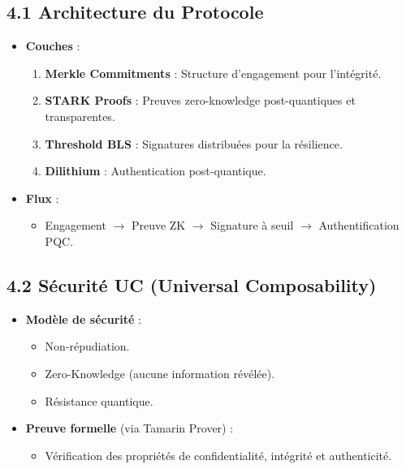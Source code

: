 \documentclass[12pt, a4paper]{report}
\begin{document}
\subsection*{4.1 Architecture du Protocole}
\begin{itemize}
    \item \textbf{Couches} :
    \begin{enumerate}
        \item \textbf{Merkle Commitments} : Structure d’engagement pour l’intégrité.
        \item \textbf{STARK Proofs} : Preuves zero-knowledge post-quantiques et transparentes.
        \item \textbf{Threshold BLS} : Signatures distribuées pour la résilience.
        \item \textbf{Dilithium} : Authentication post-quantique.
    \end{enumerate}
    \item \textbf{Flux} :
    \begin{itemize}
        \item Engagement $\rightarrow$ Preuve ZK $\rightarrow$ Signature à seuil $\rightarrow$ Authentification PQC.
    \end{itemize}
\end{itemize}

\subsection*{4.2 Sécurité UC (Universal Composability)}
\begin{itemize}
    \item \textbf{Modèle de sécurité} :
    \begin{itemize}
        \item Non-répudiation.
        \item Zero-Knowledge (aucune information révélée).
        \item Résistance quantique.
    \end{itemize}
    \item \textbf{Preuve formelle} (via Tamarin Prover) :
    \begin{itemize}
        \item Vérification des propriétés de confidentialité, intégrité et authenticité.
    \end{itemize}
\end{itemize}
\end{document}
